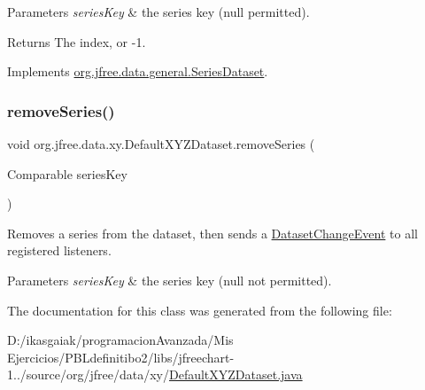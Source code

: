 \begin{DoxyParams}{Parameters}
{\em series\+Key} & the series key ({\ttfamily null} permitted).\\
\hline
\end{DoxyParams}
\begin{DoxyReturn}{Returns}
The index, or -\/1. 
\end{DoxyReturn}


Implements \mbox{\hyperlink{interfaceorg_1_1jfree_1_1data_1_1general_1_1_series_dataset_a8995ed4d70a6c4efe3a4f23318e47046}{org.\+jfree.\+data.\+general.\+Series\+Dataset}}.

\mbox{\label{classorg_1_1jfree_1_1data_1_1xy_1_1_default_x_y_z_dataset_a70beb7879083e505b730c4bdd44426c9}} 
\subsubsection{\texorpdfstring{remove\+Series()}{removeSeries()}}
{\footnotesize\ttfamily void org.\+jfree.\+data.\+xy.\+Default\+X\+Y\+Z\+Dataset.\+remove\+Series (\begin{DoxyParamCaption}\item[{Comparable}]{series\+Key }\end{DoxyParamCaption})}

Removes a series from the dataset, then sends a \mbox{\hyperlink{}{Dataset\+Change\+Event}} to all registered listeners.


\begin{DoxyParams}{Parameters}
{\em series\+Key} & the series key ({\ttfamily null} not permitted). \\
\hline
\end{DoxyParams}


The documentation for this class was generated from the following file\+:\begin{DoxyCompactItemize}
\item 
D\+:/ikasgaiak/programacion\+Avanzada/\+Mis Ejercicios/\+P\+B\+Ldefinitibo2/libs/jfreechart-\/1../source/org/jfree/data/xy/\mbox{\hyperlink{_default_x_y_z_dataset_8java}{Default\+X\+Y\+Z\+Dataset.\+java}}\end{DoxyCompactItemize}
